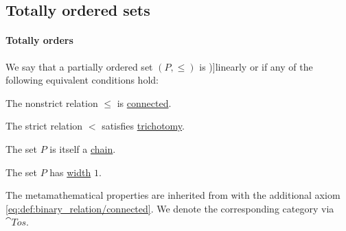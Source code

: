 \subsection{Totally ordered sets}\label{subsec:totally_ordered_sets}

\paragraph{Totally orders}

\begin{definition}\label{def:totally_ordered_set}
  We say that a partially ordered set \( (P, \leq) \) is \term[ru=линейно упорядоченое множество (\cite[def. 3.4]{Гуров2013Решётки})]{linearly} or  if any of the following equivalent conditions hold:
  \begin{thmenum}
     The nonstrict relation \( \leq \) is \hyperref[def:binary_relation/connected]{connected}.

     The strict relation \( < \) satisfies \hyperref[def:binary_relation/trichotomy]{trichotomy}.

     The set \( P \) is itself a \hyperref[def:partial_order_chain/chain]{chain}.

     The set \( P \) has \hyperref[def:partial_order_chain/width]{width} \( 1 \).
  \end{thmenum}
\end{definition}
\begin{comments}
  \item The metamathematical properties are inherited from  with the additional axiom \eqref{eq:def:binary_relation/connected}. We denote the corresponding category via \( \cat{Tos} \).
\end{comments}
